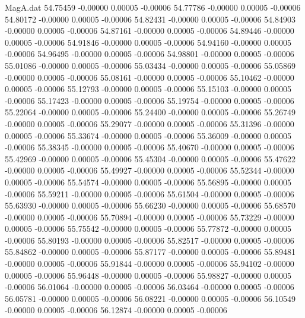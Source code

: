 \begin{filecontents}{MagA.dat}
  54.75459   -0.00000    0.00005   -0.00006
  54.77786   -0.00000    0.00005   -0.00006
  54.80172   -0.00000    0.00005   -0.00006
  54.82431   -0.00000    0.00005   -0.00006
  54.84903   -0.00000    0.00005   -0.00006
  54.87161   -0.00000    0.00005   -0.00006
  54.89446   -0.00000    0.00005   -0.00006
  54.91846   -0.00000    0.00005   -0.00006
  54.94160   -0.00000    0.00005   -0.00006
  54.96495   -0.00000    0.00005   -0.00006
  54.98801   -0.00000    0.00005   -0.00006
  55.01086   -0.00000    0.00005   -0.00006
  55.03434   -0.00000    0.00005   -0.00006
  55.05869   -0.00000    0.00005   -0.00006
  55.08161   -0.00000    0.00005   -0.00006
  55.10462   -0.00000    0.00005   -0.00006
  55.12793   -0.00000    0.00005   -0.00006
  55.15103   -0.00000    0.00005   -0.00006
  55.17423   -0.00000    0.00005   -0.00006
  55.19754   -0.00000    0.00005   -0.00006
  55.22064   -0.00000    0.00005   -0.00006
  55.24400   -0.00000    0.00005   -0.00006
  55.26749   -0.00000    0.00005   -0.00006
  55.29077   -0.00000    0.00005   -0.00006
  55.31396   -0.00000    0.00005   -0.00006
  55.33674   -0.00000    0.00005   -0.00006
  55.36009   -0.00000    0.00005   -0.00006
  55.38345   -0.00000    0.00005   -0.00006
  55.40670   -0.00000    0.00005   -0.00006
  55.42969   -0.00000    0.00005   -0.00006
  55.45304   -0.00000    0.00005   -0.00006
  55.47622   -0.00000    0.00005   -0.00006
  55.49927   -0.00000    0.00005   -0.00006
  55.52344   -0.00000    0.00005   -0.00006
  55.54574   -0.00000    0.00005   -0.00006
  55.56895   -0.00000    0.00005   -0.00006
  55.59211   -0.00000    0.00005   -0.00006
  55.61504   -0.00000    0.00005   -0.00006
  55.63930   -0.00000    0.00005   -0.00006
  55.66230   -0.00000    0.00005   -0.00006
  55.68570   -0.00000    0.00005   -0.00006
  55.70894   -0.00000    0.00005   -0.00006
  55.73229   -0.00000    0.00005   -0.00006
  55.75542   -0.00000    0.00005   -0.00006
  55.77872   -0.00000    0.00005   -0.00006
  55.80193   -0.00000    0.00005   -0.00006
  55.82517   -0.00000    0.00005   -0.00006
  55.84862   -0.00000    0.00005   -0.00006
  55.87177   -0.00000    0.00005   -0.00006
  55.89481   -0.00000    0.00005   -0.00006
  55.91844   -0.00000    0.00005   -0.00006
  55.94102   -0.00000    0.00005   -0.00006
  55.96448   -0.00000    0.00005   -0.00006
  55.98827   -0.00000    0.00005   -0.00006
  56.01064   -0.00000    0.00005   -0.00006
  56.03464   -0.00000    0.00005   -0.00006
  56.05781   -0.00000    0.00005   -0.00006
  56.08221   -0.00000    0.00005   -0.00006
  56.10549   -0.00000    0.00005   -0.00006
  56.12874   -0.00000    0.00005   -0.00006

\end{filecontents}
